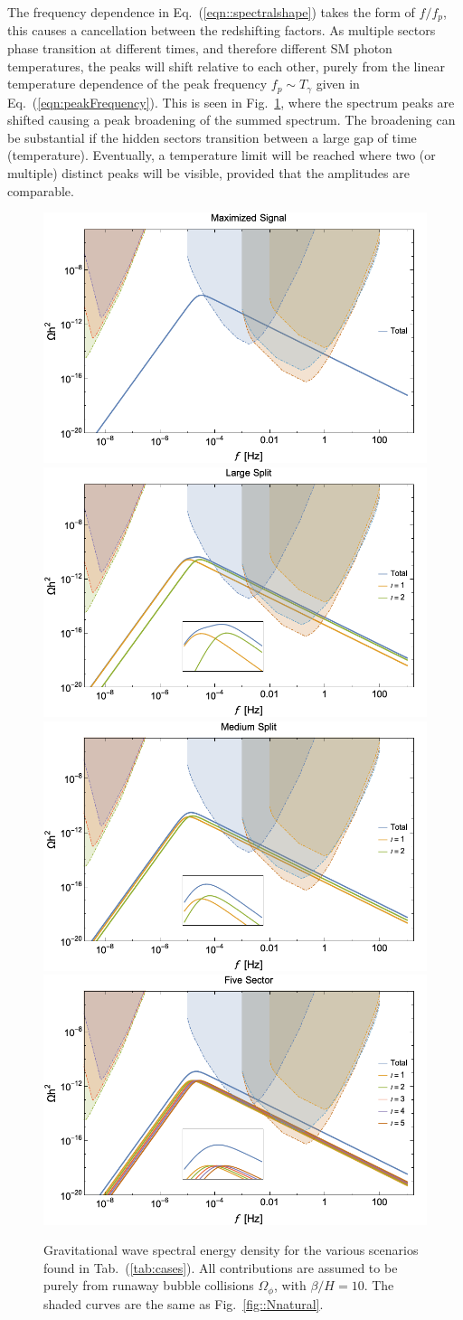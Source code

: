 \documentclass[nofootinbib,twocolumn,preprintnumbers]{revtex4-1}
\begin{document}
The frequency dependence in Eq.~(\ref{eqn::spectralshape}) takes the form of $f/f_{p}$, this causes a cancellation between the redshifting factors. As multiple sectors phase transition at different times, and therefore different SM photon temperatures, the peaks will shift relative to each other, purely from the linear temperature dependence of the peak frequency $f_{p} \sim T_{\gamma}$ given in Eq.~(\ref{eqn:peakFrequency}).  This is seen in Fig.~\ref{fig:Haa}, where the spectrum peaks are shifted causing a peak broadening of the summed spectrum. The broadening can be substantial if the hidden sectors transition between a large gap of time (temperature). Eventually, a temperature limit will be reached where two (or multiple) distinct peaks will be visible, provided that the amplitudes are comparable. 

\begin{figure}[tb]
\centering
\begin{minipage}[c]{\textwidth}
\includegraphics[width=.45\textwidth ]{highest.png}
\hfill
\includegraphics[width=.45\textwidth]{TwoFar.png} 
\hfill
\includegraphics[width=.45\textwidth]{TwoMed.png} 
\hfill
\includegraphics[width=.45\textwidth]{energydensity.png} 
\end{minipage}
\hfill
\caption{ Gravitational wave spectral energy density for the various scenarios found in Tab.~(\ref{tab:cases}).  All contributions are assumed to be purely from runaway bubble collisions $\Omega_{\phi}$, with $\beta/H  = 10$.  The shaded curves are the same as Fig.~\ref{fig::Nnatural}.   }
\label{fig:Haa}
\end{figure}
\end{document}
